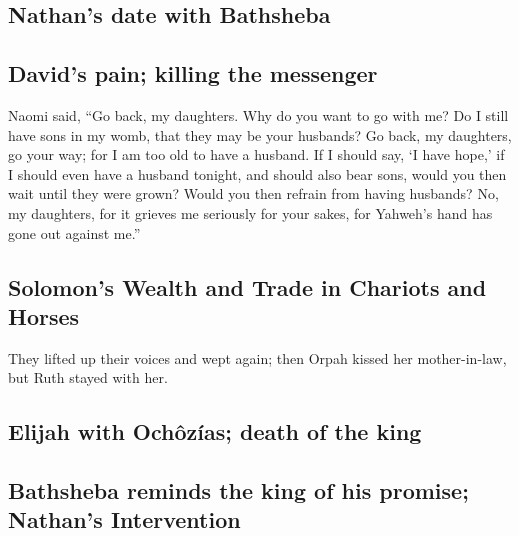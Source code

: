 \begin{paracol}{2}
\begin{otherlanguage}{english}
\hypertarget{nathans-date-with-bathsheba}{%
\subsection{Nathan's date with
Bathsheba}\label{nathans-date-with-bathsheba}}

\hypertarget{davids-pain-killing-the-messenger}{%
\subsection{David's pain; killing the
messenger}\label{davids-pain-killing-the-messenger}}

 Naomi said, ``Go back, my daughters. Why do you want to
go with me? Do I still have sons in my womb, that they may be your
husbands?  Go back, my daughters, go your way; for I am
too old to have a husband. If I should say, `I have hope,' if I should
even have a husband tonight, and should also bear sons, 
would you then wait until they were grown? Would you then refrain from
having husbands? No, my daughters, for it grieves me seriously for your
sakes, for Yahweh's hand has gone out against me.''

\hypertarget{solomons-wealth-and-trade-in-chariots-and-horses}{%
\subsection{Solomon's Wealth and Trade in Chariots and
Horses}\label{solomons-wealth-and-trade-in-chariots-and-horses}}

 They lifted up their voices and wept again; then Orpah
kissed her mother-in-law, but Ruth stayed with her.

\hypertarget{elijah-with-ochuxf4zuxedas-death-of-the-king}{%
\subsection{Elijah with Ochôzías; death of the
king}\label{elijah-with-ochuxf4zuxedas-death-of-the-king}}

\hypertarget{bathsheba-reminds-the-king-of-his-promise-nathans-intervention}{%
\subsection{Bathsheba reminds the king of his promise; Nathan's
Intervention}\label{bathsheba-reminds-the-king-of-his-promise-nathans-intervention}}


\end{otherlanguage}
\end{paracol}
